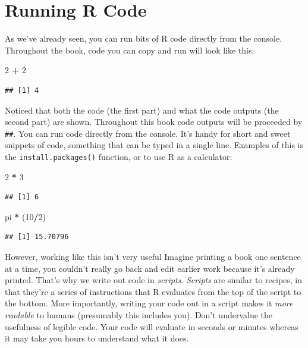 \documentclass[
]{book}
\newenvironment{Shaded}{\begin{snugshade}}{\end{snugshade}}
\newcommand{\DecValTok}[1]{\textcolor[rgb]{0.00,0.00,0.81}{#1}}
\newcommand{\NormalTok}[1]{#1}
\newcommand{\SpecialCharTok}[1]{\textcolor[rgb]{0.81,0.36,0.00}{\textbf{#1}}}
\begin{document}
\hypertarget{running-r-code}{%
\section{Running R Code}\label{running-r-code}}

As we've already seen, you can run bits of R code directly from the console. Throughout the book, code you can copy and run will look like this:

\begin{Shaded}
\begin{Highlighting}[]
\DecValTok{2} \SpecialCharTok{+} \DecValTok{2}
\end{Highlighting}
\end{Shaded}

\begin{verbatim}
## [1] 4
\end{verbatim}

Noticed that both the code (the first part) and what the code outputs (the second part) are shown. Throughout this book code outputs will be proceeded by \texttt{\#\#}. You can run code directly from the console. It's handy for short and sweet snippets of code, something that can be typed in a single line. Examples of this is the \texttt{install.packages()} function, or to use R as a calculator:

\begin{Shaded}
\begin{Highlighting}[]
\DecValTok{2} \SpecialCharTok{*} \DecValTok{3}
\end{Highlighting}
\end{Shaded}

\begin{verbatim}
## [1] 6
\end{verbatim}

\begin{Shaded}
\begin{Highlighting}[]
\NormalTok{pi }\SpecialCharTok{*}\NormalTok{ (}\DecValTok{10}\SpecialCharTok{/}\DecValTok{2}\NormalTok{)}
\end{Highlighting}
\end{Shaded}

\begin{verbatim}
## [1] 15.70796
\end{verbatim}

However, working like this isn't very useful Imagine printing a book one sentence at a time, you couldn't really go back and edit earlier work because it's already printed. That's why we write out code in \emph{scripts}. \emph{Scripts} are similar to recipes, in that they're a series of instructions that R evaluates from the top of the script to the bottom. More importantly, writing your code out in a script makes it \emph{more readable} to humans (presumably this includes you). Don't undervalue the usefulness of legible code. Your code will evaluate in seconds or minutes whereas it may take you hours to understand what it does.
\end{document}
